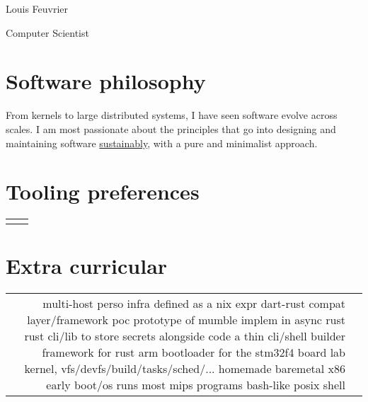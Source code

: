 \documentclass[
	10pt, %
]{freemancv}
\begin{document}
\begin{paracol}{2} %

\parbox[][0.11\textheight][c]{\linewidth}{ %
	\centering %

	{\sffamily\Huge Louis Feuvrier} %

	\medskip %

	{\textcolor{headings}{Computer Scientist}}

	\medskip %


	\vfill %
}

\section{Software philosophy}
From kernels to large distributed systems, I have seen software evolve across
scales. I am most passionate about the principles that go into designing and
maintaining software \href{https://louis.feuvrier.org/naur1985programming.pdf}{sustainably},
with a pure and minimalist approach.

\section{Tooling preferences}
\begin{supertabular}{r l} %
\end{supertabular}

\section{Extra curricular}
\begin{supertabular}{r l} %
		{multi-host perso infra defined as a nix expr}{}
		{dart-rust compat layer/framework poc}{}
		{prototype of mumble implem in async rust}{}
		{rust cli/lib to store secrets alongside code}{}
		{a thin cli/shell builder framework for rust}{}
		{arm bootloader for the stm32f4 board}{}
		{lab kernel, vfs/devfs/build/tasks/sched/...}{}
		{homemade baremetal x86 early boot/os}{}
		{runs most mips programs}{}
		{bash-like posix shell}{}
\end{supertabular}


\end{paracol}
\end{document}
